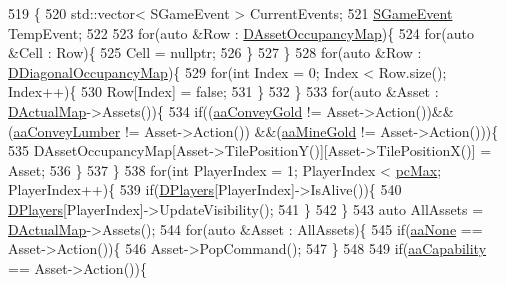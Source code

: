 \begin{DoxyCode}
519                          \{
520     std::vector< SGameEvent > CurrentEvents;
521     \hyperlink{structSGameEvent}{SGameEvent} TempEvent;
522     
523     \textcolor{keywordflow}{for}(\textcolor{keyword}{auto} &Row : \hyperlink{classCGameModel_a2207654c461a3654c6d765dd5421373f}{DAssetOccupancyMap})\{
524         \textcolor{keywordflow}{for}(\textcolor{keyword}{auto} &Cell : Row)\{
525             Cell = \textcolor{keyword}{nullptr};
526         \}
527     \}
528     \textcolor{keywordflow}{for}(\textcolor{keyword}{auto} &Row : \hyperlink{classCGameModel_a30e26a862e4eb282a275ed192017c248}{DDiagonalOccupancyMap})\{
529         \textcolor{keywordflow}{for}(\textcolor{keywordtype}{int} Index = 0; Index < Row.size(); Index++)\{
530             Row[Index] = \textcolor{keyword}{false};
531         \}
532     \}
533     \textcolor{keywordflow}{for}(\textcolor{keyword}{auto} &Asset : \hyperlink{classCGameModel_ace04c3b62d6b71e20d1ed5460c0c3cee}{DActualMap}->Assets())\{
534         \textcolor{keywordflow}{if}((\hyperlink{GameDataTypes_8h_ab47668e651a3032cfb9c40ea2d60d670ae80ac4dde60023e0a1794e994db7000a}{aaConveyGold} != Asset->Action())&&(\hyperlink{GameDataTypes_8h_ab47668e651a3032cfb9c40ea2d60d670a7b0954302f27f46b3fdf6fddd530d154}{aaConveyLumber} != Asset->Action())
      &&(\hyperlink{GameDataTypes_8h_ab47668e651a3032cfb9c40ea2d60d670abc45b1c4fbca1481e373a780a69bd56b}{aaMineGold} != Asset->Action()))\{
535             DAssetOccupancyMap[Asset->TilePositionY()][Asset->TilePositionX()] = Asset;
536         \}
537     \}
538     \textcolor{keywordflow}{for}(\textcolor{keywordtype}{int} PlayerIndex = 1; PlayerIndex < \hyperlink{GameDataTypes_8h_aafb0ca75933357ff28a6d7efbdd7602fa594a5c8dd3987f24e8a0f23f1a72cd34}{pcMax}; PlayerIndex++)\{
539         \textcolor{keywordflow}{if}(\hyperlink{classCGameModel_a524436c3560b10e1c6d6fdd0b66565dc}{DPlayers}[PlayerIndex]->IsAlive())\{
540             \hyperlink{classCGameModel_a524436c3560b10e1c6d6fdd0b66565dc}{DPlayers}[PlayerIndex]->UpdateVisibility();
541         \}
542     \}
543     \textcolor{keyword}{auto} AllAssets = \hyperlink{classCGameModel_ace04c3b62d6b71e20d1ed5460c0c3cee}{DActualMap}->Assets();
544     \textcolor{keywordflow}{for}(\textcolor{keyword}{auto} &Asset : AllAssets)\{
545         \textcolor{keywordflow}{if}(\hyperlink{GameDataTypes_8h_ab47668e651a3032cfb9c40ea2d60d670ac17cc5a0035320c060d7f8074143b507}{aaNone} == Asset->Action())\{
546             Asset->PopCommand(); 
547         \}
548         
549         \textcolor{keywordflow}{if}(\hyperlink{GameDataTypes_8h_ab47668e651a3032cfb9c40ea2d60d670acf9fb164e8abd71c71f4a8c7fda360d4}{aaCapability} == Asset->Action())\{

\end{DoxyCode}

